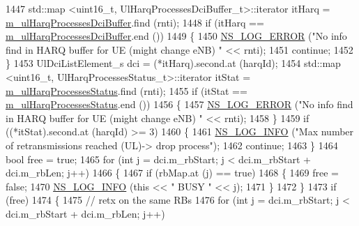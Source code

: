 \begin{DoxyCode}
1447               std::map <uint16\_t, UlHarqProcessesDciBuffer\_t>::iterator itHarq = 
      \hyperlink{classns3_1_1FdMtFfMacScheduler_a43c0d140a807beae5125340c8df8dcdd}{m\_ulHarqProcessesDciBuffer}.find (rnti);
1448               \textcolor{keywordflow}{if} (itHarq == \hyperlink{classns3_1_1FdMtFfMacScheduler_a43c0d140a807beae5125340c8df8dcdd}{m\_ulHarqProcessesDciBuffer}.end ())
1449                 \{
1450                   \hyperlink{group__logging_ga0261a8db1d4ac5f79417d117634fd455}{NS\_LOG\_ERROR} (\textcolor{stringliteral}{"No info find in HARQ buffer for UE (might change eNB) "} << 
      rnti);
1451                   \textcolor{keywordflow}{continue};
1452                 \}
1453               UlDciListElement\_s dci = (*itHarq).second.at (harqId);
1454               std::map <uint16\_t, UlHarqProcessesStatus\_t>::iterator itStat = 
      \hyperlink{classns3_1_1FdMtFfMacScheduler_a22401d77ac7acda9217ac4807fd55fa2}{m\_ulHarqProcessesStatus}.find (rnti);
1455               \textcolor{keywordflow}{if} (itStat == \hyperlink{classns3_1_1FdMtFfMacScheduler_a22401d77ac7acda9217ac4807fd55fa2}{m\_ulHarqProcessesStatus}.end ())
1456                 \{
1457                   \hyperlink{group__logging_ga0261a8db1d4ac5f79417d117634fd455}{NS\_LOG\_ERROR} (\textcolor{stringliteral}{"No info find in HARQ buffer for UE (might change eNB) "} << 
      rnti);
1458                 \}
1459               \textcolor{keywordflow}{if} ((*itStat).second.at (harqId) >= 3)
1460                 \{
1461                   \hyperlink{group__logging_gafbd73ee2cf9f26b319f49086d8e860fb}{NS\_LOG\_INFO} (\textcolor{stringliteral}{"Max number of retransmissions reached (UL)-> drop process"});
1462                   \textcolor{keywordflow}{continue};
1463                 \}
1464               \textcolor{keywordtype}{bool} free = \textcolor{keyword}{true};
1465               \textcolor{keywordflow}{for} (\textcolor{keywordtype}{int} j = dci.m\_rbStart; j < dci.m\_rbStart + dci.m\_rbLen; j++)
1466                 \{
1467                   \textcolor{keywordflow}{if} (rbMap.at (j) == \textcolor{keyword}{true})
1468                     \{
1469                       free = \textcolor{keyword}{false};
1470                       \hyperlink{group__logging_gafbd73ee2cf9f26b319f49086d8e860fb}{NS\_LOG\_INFO} (\textcolor{keyword}{this} << \textcolor{stringliteral}{" BUSY "} << j);
1471                     \}
1472                 \}
1473               \textcolor{keywordflow}{if} (free)
1474                 \{
1475                   \textcolor{comment}{// retx on the same RBs}
1476                   \textcolor{keywordflow}{for} (\textcolor{keywordtype}{int} j = dci.m\_rbStart; j < dci.m\_rbStart + dci.m\_rbLen; j++)

\end{DoxyCode}
